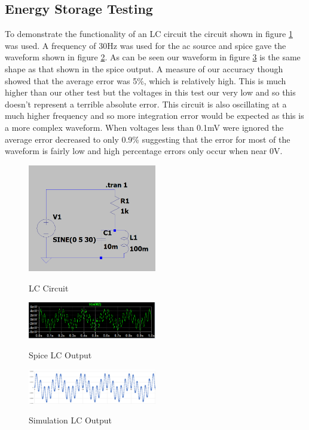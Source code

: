 \documentclass{article}
\begin{document}
\subsection{Energy Storage Testing}
To demonstrate the functionality of an LC circuit the circuit shown in figure \ref{fig:LCCircuit1} was used. A frequency of 30Hz was used for the ac source and spice gave the waveform shown in figure \ref{fig:LCSpice1}. As can be seen our waveform in figure \ref{fig:LCOutput1} is the same shape as that shown in the spice output. A measure of our accuracy though showed that the average error was 5\%, which is relatively high. This is much higher than our other test but the voltages in this test our very low and so this doesn't represent a terrible absolute error. This circuit is also oscillating at a much higher frequency and so more integration error would be expected as this is a more complex waveform. When voltages less than 0.1mV were ignored the average error decreased to only 0.9\% suggesting that the error for most of the waveform is fairly low and high percentage errors only occur when near 0V. 
\begin{figure}[!h]
    \caption{LC Circuit}
    \centering
    \includegraphics[width=0.5\textwidth]{images/LCCircuit1.png}
    \label{fig:LCCircuit1}
\end{figure}
\begin{figure}[!h]
    \caption{Spice LC Output}
    \centering
    \includegraphics[width=0.5\textwidth]{images/LCSpice1.png}
    \label{fig:LCSpice1}
\end{figure}
\begin{figure}[!h]
    \caption{Simulation LC Output}
    \centering
    \includegraphics[width=0.5\textwidth]{images/LCOutput1.png}
    \label{fig:LCOutput1}
\end{figure}
\smallbreak
\newpage
\end{document}
